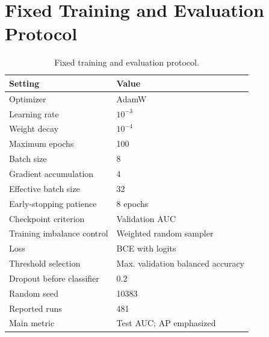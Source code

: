 \section{Fixed Training and Evaluation Protocol}

\begin{table}[t]
\centering
\caption{Fixed training and evaluation protocol.}
\label{tab:protocol}
\scriptsize
\begin{tabular}{ll}
\toprule
Setting & Value \\
\midrule
Optimizer & AdamW \\
Learning rate & $10^{-3}$ \\
Weight decay & $10^{-4}$ \\
Maximum epochs & 100 \\
Batch size & 8 \\
Gradient accumulation & 4 \\
Effective batch size & 32 \\
Early-stopping patience & 8 epochs \\
Checkpoint criterion & Validation AUC \\
Training imbalance control & Weighted random sampler \\
Loss & BCE with logits \\
Threshold selection & Max. validation balanced accuracy \\
Dropout before classifier & 0.2 \\
Random seed & 10383 \\
Reported runs & 481 \\
Main metric & Test AUC; AP emphasized \\
\bottomrule
\end{tabular}
\end{table}
